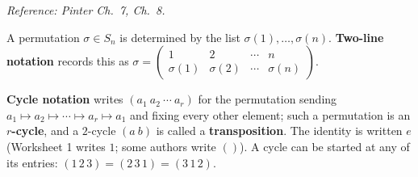 \documentclass[11pt]{report}
\begin{document}
\textit{Reference: Pinter Ch.\ 7, Ch.\ 8.}

\begin{defbox}\label{def:two-line-cycle-notation}
A permutation $\sigma \in S_n$ is determined by the list $\sigma(1), \ldots, \sigma(n)$. \textbf{Two-line notation} records this as
$\sigma = \begin{pmatrix} 1 & 2 & \cdots & n \\ \sigma(1) & \sigma(2) & \cdots & \sigma(n) \end{pmatrix}$.
\end{defbox}

\begin{defbox}\label{def:cycle-notation}
\textbf{Cycle notation} writes $(a_1\ a_2\ \cdots\ a_r)$ for the permutation sending $a_1 \mapsto a_2 \mapsto \cdots \mapsto a_r \mapsto a_1$ and fixing every other element; such a permutation is an \textbf{$r$-cycle}, and a $2$-cycle $(a\ b)$ is called a \textbf{transposition}. The identity is written $e$ (Worksheet 1 writes $1$; some authors write $()$). A cycle can be started at any of its entries: $(1\,2\,3) = (2\,3\,1) = (3\,1\,2)$.
\end{defbox}
\end{document}
